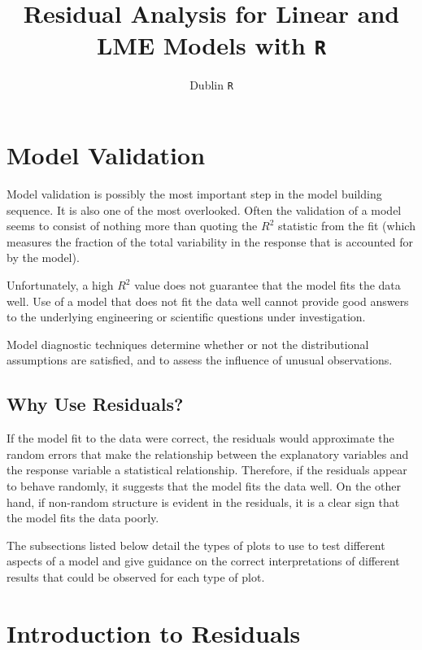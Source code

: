 \documentclass[12pt, a4paper]{article}
\title{Residual Analysis for Linear and LME Models with \texttt{R}}
\author{Dublin \texttt{R}}
\theoremstyle{plain}
\theoremstyle{definition}
\theoremstyle{remark}
\begin{document}
\maketitle

\tableofcontents
\newpage
\section{Model Validation}
Model validation is possibly the most important step in the model building sequence. It is also one of the most overlooked. Often the validation of a model seems to consist of nothing more than quoting the $R^2$ statistic from the fit (which measures the fraction of the total variability in the response that is accounted for by the model). 

Unfortunately, a high $R^2$ value does not guarantee that the model fits the data well. Use of a model that does not fit the data well cannot provide good answers to the underlying engineering or scientific questions under investigation.



Model diagnostic techniques determine whether or not the distributional assumptions are satisfied, and to assess the influence of unusual observations.


\subsection{Why Use Residuals?}

If the model fit to the data were correct, the residuals would approximate the random errors that make the relationship between the explanatory variables and the response variable a statistical relationship. Therefore, if the residuals appear to behave randomly, it suggests that the model fits the data well. On the other hand, if non-random structure is evident in the residuals, it is a clear sign that the model fits the data poorly. 

The subsections listed below detail the types of plots to use to test different aspects of a model and give guidance on the correct interpretations of different results that could be observed for each type of plot.
\section{Introduction to Residuals}
\end{document}

